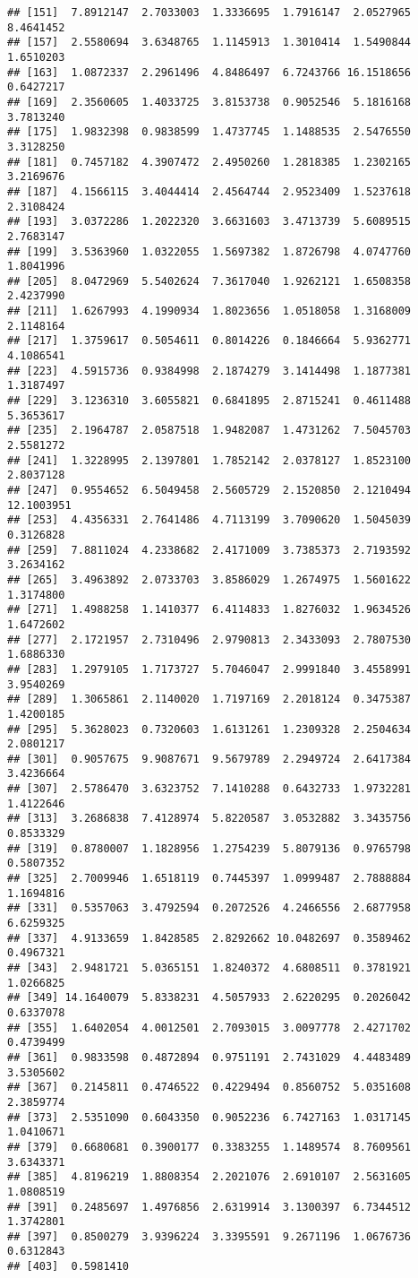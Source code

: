 \documentclass[
]{article}
\begin{document}
\begin{verbatim}
## [151]  7.8912147  2.7033003  1.3336695  1.7916147  2.0527965  8.4641452
## [157]  2.5580694  3.6348765  1.1145913  1.3010414  1.5490844  1.6510203
## [163]  1.0872337  2.2961496  4.8486497  6.7243766 16.1518656  0.6427217
## [169]  2.3560605  1.4033725  3.8153738  0.9052546  5.1816168  3.7813240
## [175]  1.9832398  0.9838599  1.4737745  1.1488535  2.5476550  3.3128250
## [181]  0.7457182  4.3907472  2.4950260  1.2818385  1.2302165  3.2169676
## [187]  4.1566115  3.4044414  2.4564744  2.9523409  1.5237618  2.3108424
## [193]  3.0372286  1.2022320  3.6631603  3.4713739  5.6089515  2.7683147
## [199]  3.5363960  1.0322055  1.5697382  1.8726798  4.0747760  1.8041996
## [205]  8.0472969  5.5402624  7.3617040  1.9262121  1.6508358  2.4237990
## [211]  1.6267993  4.1990934  1.8023656  1.0518058  1.3168009  2.1148164
## [217]  1.3759617  0.5054611  0.8014226  0.1846664  5.9362771  4.1086541
## [223]  4.5915736  0.9384998  2.1874279  3.1414498  1.1877381  1.3187497
## [229]  3.1236310  3.6055821  0.6841895  2.8715241  0.4611488  5.3653617
## [235]  2.1964787  2.0587518  1.9482087  1.4731262  7.5045703  2.5581272
## [241]  1.3228995  2.1397801  1.7852142  2.0378127  1.8523100  2.8037128
## [247]  0.9554652  6.5049458  2.5605729  2.1520850  2.1210494 12.1003951
## [253]  4.4356331  2.7641486  4.7113199  3.7090620  1.5045039  0.3126828
## [259]  7.8811024  4.2338682  2.4171009  3.7385373  2.7193592  3.2634162
## [265]  3.4963892  2.0733703  3.8586029  1.2674975  1.5601622  1.3174800
## [271]  1.4988258  1.1410377  6.4114833  1.8276032  1.9634526  1.6472602
## [277]  2.1721957  2.7310496  2.9790813  2.3433093  2.7807530  1.6886330
## [283]  1.2979105  1.7173727  5.7046047  2.9991840  3.4558991  3.9540269
## [289]  1.3065861  2.1140020  1.7197169  2.2018124  0.3475387  1.4200185
## [295]  5.3628023  0.7320603  1.6131261  1.2309328  2.2504634  2.0801217
## [301]  0.9057675  9.9087671  9.5679789  2.2949724  2.6417384  3.4236664
## [307]  2.5786470  3.6323752  7.1410288  0.6432733  1.9732281  1.4122646
## [313]  3.2686838  7.4128974  5.8220587  3.0532882  3.3435756  0.8533329
## [319]  0.8780007  1.1828956  1.2754239  5.8079136  0.9765798  0.5807352
## [325]  2.7009946  1.6518119  0.7445397  1.0999487  2.7888884  1.1694816
## [331]  0.5357063  3.4792594  0.2072526  4.2466556  2.6877958  6.6259325
## [337]  4.9133659  1.8428585  2.8292662 10.0482697  0.3589462  0.4967321
## [343]  2.9481721  5.0365151  1.8240372  4.6808511  0.3781921  1.0266825
## [349] 14.1640079  5.8338231  4.5057933  2.6220295  0.2026042  0.6337078
## [355]  1.6402054  4.0012501  2.7093015  3.0097778  2.4271702  0.4739499
## [361]  0.9833598  0.4872894  0.9751191  2.7431029  4.4483489  3.5305602
## [367]  0.2145811  0.4746522  0.4229494  0.8560752  5.0351608  2.3859774
## [373]  2.5351090  0.6043350  0.9052236  6.7427163  1.0317145  1.0410671
## [379]  0.6680681  0.3900177  0.3383255  1.1489574  8.7609561  3.6343371
## [385]  4.8196219  1.8808354  2.2021076  2.6910107  2.5631605  1.0808519
## [391]  0.2485697  1.4976856  2.6319914  3.1300397  6.7344512  1.3742801
## [397]  0.8500279  3.9396224  3.3395591  9.2671196  1.0676736  0.6312843
## [403]  0.5981410
\end{verbatim}
\end{document}
